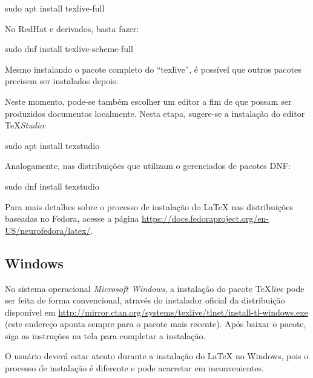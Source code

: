 \begin{meucomando}
sudo apt install texlive-full
\end{meucomando}

No RedHat e derivados, basta fazer:

\begin{meucomando}
sudo dnf install texlive-scheme-full
\end{meucomando}

\begin{marker}
Mesmo instalando o pacote completo do ``texlive'', é possível que outros pacotes precisem ser instalados depois.
\end{marker}

Neste momento, pode-se também escolher um editor a fim de que possam ser produzidos documentos localmente. Nesta etapa, sugere-se a instalação do editor \TeX \textit{Studio}:

\begin{meucomando}
sudo apt install texstudio
\end{meucomando}

Analogamente, nas distribuições que utilizam o gerenciados de pacotes DNF:

\begin{meucomando}
sudo dnf install texstudio
\end{meucomando}

\begin{marker}
Para mais detalhes sobre o processo de instalação do \LaTeX{} nas distribuições baseadas no Fedora, acesse a página \url{https://docs.fedoraproject.org/en-US/neurofedora/latex/}. 
\end{marker}

\subsection*{Windows}
\label{sec:windows}

No sistema operacional \textit{Microsoft Windows}, a instalação do pacote \TeX \textit{live} pode ser feita de forma convencional, através do instalador oficial da distribuição disponível em \url{http://mirror.ctan.org/systems/texlive/tlnet/install-tl-windows.exe} (este endereço aponta sempre para o pacote mais recente). Após baixar o pacote, siga as instruções na tela para completar a instalação.

\begin{marker}
O usuário deverá estar atento durante a instalação do \LaTeX{} no Windows, pois o processo de instalação é diferente e pode acarretar em inconvenientes.
\end{marker}


